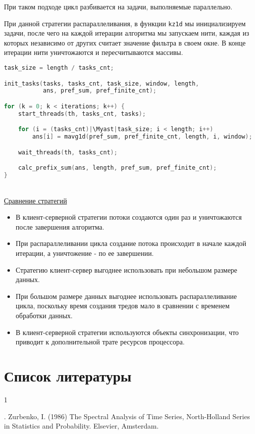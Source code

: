 При таком подходе цикл разбивается на задачи, выполняемые параллельно.

При данной стратегии распараллеливания, в функции \texttt{kz1d} мы инициализируем задачи, после чего на каждой итерации алгоритма мы запускаем нити, каждая из которых независимо от других считает значение фильтра в своем окне. В конце итерации нити уничтожаются и пересчитываются массивы.
\begin{lstlisting}[language=C, caption={Стратегия распараллеливания цикла}, escapeinside=||]
task_size = length / tasks_cnt;

init_tasks(tasks, tasks_cnt, task_size, window, length,
           ans, pref_sum, pref_finite_cnt);

for (k = 0; k < iterations; k++) {
    start_threads(th, tasks_cnt, tasks);

    for (i = (tasks_cnt)|\Myast|task_size; i < length; i++)
        ans[i] = mavg1d(pref_sum, pref_finite_cnt, length, i, window);

    wait_threads(th, tasks_cnt);

    calc_prefix_sum(ans, length, pref_sum, pref_finite_cnt);
}
\end{lstlisting}
\\
\underline{Сравнение стратегий}
\begin{itemize}
    \item В клиент-серверной стратегии потоки создаются один раз и уничтожаются после завершения алгоритма.
    \item При распараллеливании цикла создание потока происходит в начале каждой итерации, а уничтожение - по ее завершении.
    \item Стратегию клиент-сервер выгоднее использовать при небольшом размере данных.
    \item При большом размере данных выгоднее использовать распараллеливание цикла, поскольку время создания тредов мало в сравнении с временем обработки данных.
    \item В клиент-серверной стратегии используются объекты синхронизации, что приводит к дополнительной трате ресурсов процессора.
\end{itemize}

\newpage
\section*{\centering Список литературы}
\hypertarget{first}{1}. Zurbenko, I. (1986) The Spectral Analysis of Time Series, North-Holland Series in Statistics and Probability. Elsevier, Amsterdam.


